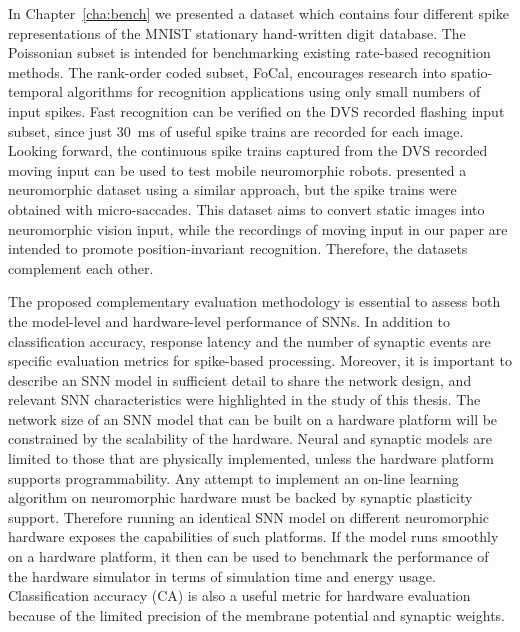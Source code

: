 %
In Chapter~\ref{cha:bench} we presented a dataset which contains four different spike representations of the MNIST stationary hand-written digit database. %
The Poissonian subset is intended for benchmarking existing rate-based recognition methods.
The rank-order coded subset, FoCal, encourages research into spatio-temporal algorithms for recognition applications using only small numbers of input spikes.
Fast recognition can be verified on the DVS recorded flashing input subset, since just 30~ms of useful spike trains are recorded for each image.
Looking forward, the continuous spike trains captured from the DVS recorded moving input can be used to test mobile neuromorphic robots.
\citet{orchard2015convert} presented a neuromorphic dataset using a similar approach, but the spike trains were obtained with micro-saccades.
This dataset aims to convert static images into neuromorphic vision input, while the recordings of moving input in our paper are intended to promote position-invariant recognition.
Therefore, the datasets complement each other.

The proposed complementary evaluation methodology is essential to assess both the model-level and hardware-level performance of SNNs.
In addition to classification accuracy, response latency and the number of synaptic events are specific evaluation metrics for spike-based processing.
Moreover, it is important to describe an SNN model in sufficient detail to share the network design, and relevant SNN characteristics were highlighted in the study of this thesis.  
The network size of an SNN model that can be built on a hardware platform will be constrained by the scalability of the hardware.
Neural and synaptic models are limited to those that are physically implemented, unless the hardware platform supports programmability.
Any attempt to implement an on-line learning algorithm on neuromorphic hardware must be backed by synaptic plasticity support.
Therefore running an identical SNN model on different neuromorphic hardware exposes the capabilities of such platforms.
If the model runs smoothly on a hardware platform, it then can be used to benchmark the performance of the hardware simulator in terms of simulation time and energy usage.
Classification accuracy (CA) is also a useful metric for hardware evaluation because of the limited precision of the membrane potential and synaptic weights.



